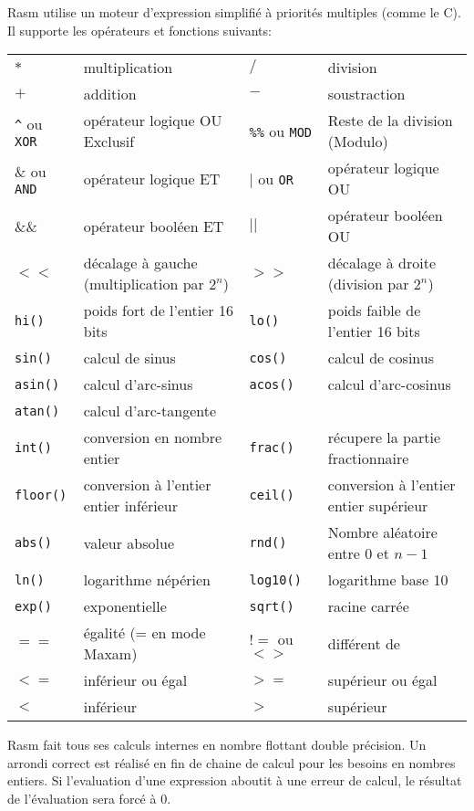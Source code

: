 \begin{xfr}
  Rasm utilise un moteur d'expression simplifié à priorités multiples (comme le C). Il supporte les opérateurs et fonctions suivants:

\begin{tabular}{ll|ll}
$*$ & multiplication &
$/$ & division \\
$+$ & addition &
$-$ & soustraction \\

\texttt{\^}  ou \texttt{XOR} & opérateur logique OU Exclusif &
\texttt{\%\%} ou \texttt{MOD} & Reste de la division (Modulo) \\

\& ou \texttt{AND} & opérateur logique ET &
$|$ ou \texttt{OR} & opérateur logique OU \\
\&\& & opérateur booléen ET &
$||$ & opérateur booléen OU \\
$<<$ & décalage à gauche (multiplication par $2^n$) &
$>>$ & décalage à droite (division par $2^n$) \\


\texttt{hi()} & poids fort de l'entier 16 bits &
\texttt{lo()} & poids faible de l'entier 16 bits \\

\texttt{sin()} & calcul de sinus &
\texttt{cos()} & calcul de cosinus \\
\texttt{asin()} & calcul d'arc-sinus &
\texttt{acos()} & calcul d'arc-cosinus \\

\texttt{atan()} & calcul d'arc-tangente &
& \\
\texttt{int()} & conversion en nombre entier &
\texttt{frac()} & récupere la partie fractionnaire  \\
\texttt{floor()} & conversion à l'entier entier inférieur &
\texttt{ceil()} & conversion à l'entier entier supérieur \\
\texttt{abs()} & valeur absolue &
\texttt{rnd()} & Nombre aléatoire entre 0 et $n-1$ \\

\texttt{ln()} & logarithme népérien &
\texttt{log10()} & logarithme base 10 \\
\texttt{exp()} & exponentielle &
\texttt{sqrt()} & racine carrée \\

\texttt{$==$} & égalité (= en mode Maxam) &
\texttt{$!=$} ou \texttt{$<>$} & différent de \\
\texttt{$<=$} & inférieur ou égal &
\texttt{$>=$} & supérieur ou égal \\
\texttt{$<$} & inférieur &
\texttt{$>$} & supérieur \\

\end{tabular}

\medskip
Rasm fait tous ses calculs internes en nombre flottant double précision.
Un arrondi correct est réalisé en fin de chaine de calcul pour les besoins en nombres entiers.
Si l'evaluation d'une expression aboutit à une erreur de calcul, le résultat de l'évaluation sera forcé à 0.
\end{xfr}

